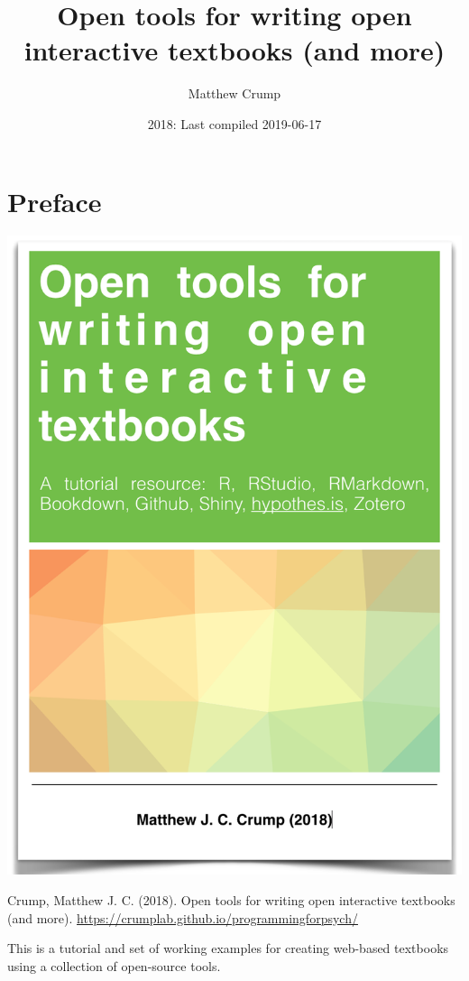 \documentclass[]{book}
\title{Open tools for writing open interactive textbooks (and more)}
\author{Matthew Crump}
\date{2018: Last compiled 2019-06-17}
\begin{document}
\maketitle

{
\setcounter{tocdepth}{1}
\tableofcontents
}
\chapter*{Preface}\label{preface}

\begin{center}\includegraphics{OER} \end{center}

Crump, Matthew J. C. (2018). Open tools for writing open interactive
textbooks (and more).
\url{https://crumplab.github.io/programmingforpsych/}

This is a tutorial and set of working examples for creating web-based
textbooks using a collection of open-source tools.
\end{document}
